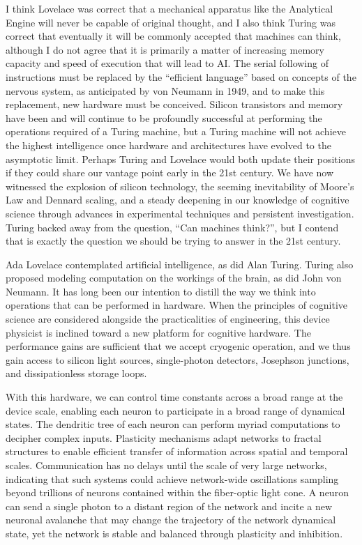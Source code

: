 I think Lovelace was correct that a mechanical apparatus like the Analytical Engine will never be capable of original thought, and I also think Turing was correct that eventually it will be commonly accepted that machines can think, although I do not agree that it is primarily a matter of increasing memory capacity and speed of execution that will lead to AI. The serial following of instructions must be replaced by the ``efficient language'' based on concepts of the nervous system, as anticipated by von Neumann in 1949, and to make this replacement, new hardware must be conceived. Silicon transistors and memory have been and will continue to be profoundly successful at performing the operations required of a Turing machine, but a Turing machine will not achieve the highest intelligence once hardware and architectures have evolved to the asymptotic limit. Perhaps Turing and Lovelace would both update their positions if they could share our vantage point early in the 21st century. We have now witnessed the explosion of silicon technology, the seeming inevitability of Moore's Law and Dennard scaling, and a steady deepening in our knowledge of cognitive science through advances in experimental techniques and persistent investigation. Turing backed away from the question, ``Can machines think?'', but I contend that is exactly the question we should be trying to answer in the 21st century. 


\vspace{3em}
Ada Lovelace contemplated artificial intelligence, as did Alan Turing. Turing also proposed modeling computation on the workings of the brain, as did John von Neumann. It has long been our intention to distill the way we think into operations that can be performed in hardware. When the principles of cognitive science are considered alongside the practicalities of engineering, this device physicist is inclined toward a new platform for cognitive hardware. The performance gains are sufficient that we accept cryogenic operation, and we thus gain access to silicon light sources, single-photon detectors, Josephson junctions, and dissipationless storage loops.

With this hardware, we can control time constants across a broad range at the device scale, enabling each neuron to participate in a broad range of dynamical states. The dendritic tree of each neuron can perform myriad computations to decipher complex inputs. Plasticity mechanisms adapt networks to fractal structures to enable efficient transfer of information across spatial and temporal scales. Communication has no delays until the scale of very large networks, indicating that such systems could achieve network-wide oscillations sampling beyond trillions of neurons contained within the fiber-optic light cone. A neuron can send a single photon to a distant region of the network and incite a new neuronal avalanche that may change the trajectory of the network dynamical state, yet the network is stable and balanced through plasticity and inhibition.

